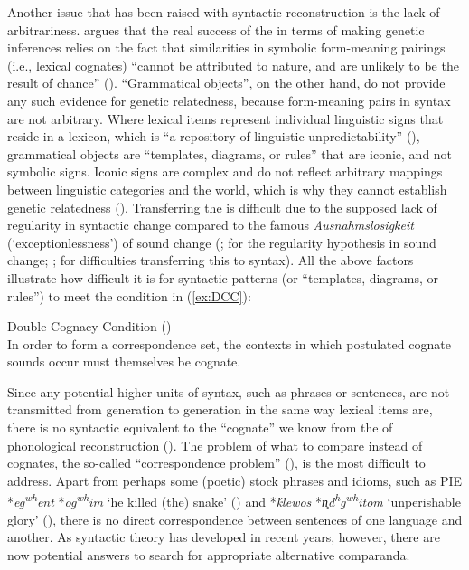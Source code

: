 \documentclass[output=paper,colorlinks,citecolor=brown]{langscibook}
\begin{document}
Another issue that has been raised with syntactic reconstruction is the lack of arbitrariness. \citet{mm:harrison_limits_2003} argues that the real success of the  in terms of making genetic inferences relies on the fact that similarities in symbolic form-meaning pairings (i.e., lexical cognates) ``cannot be attributed to nature, and are unlikely to be the result of chance'' (\cite[223]{mm:harrison_limits_2003}). “Grammatical objects”, on the other hand, do not provide any such evidence for genetic relatedness, because form-meaning pairs in syntax are not arbitrary. Where lexical items represent individual linguistic signs that reside in a lexicon, which is “a repository of linguistic unpredictability” (\cite[223]{mm:harrison_limits_2003}), grammatical objects are “templates, diagrams, or rules” that are iconic, and not symbolic signs. Iconic signs are complex and do not reflect arbitrary mappings between linguistic categories and the world, which is why they cannot establish genetic relatedness (\cite[225]{mm:harrison_limits_2003}). Transferring the  is difficult due to the supposed lack of regularity in syntactic change compared to the famous \textit{Ausnahmslosigkeit} (`exceptionlessness') of sound change (\citealt{mm:osthoff_morphologische_1878}; \citealt{mm:labov_resolving_1981} for the regularity hypothesis in sound change; \citealt{mm:lightfoot_myths_2002}; \citealt{mm:pires_how_2008} for difficulties transferring this to syntax). All the above factors illustrate how difficult it is for syntactic patterns (or “templates, diagrams, or rules”) to meet the condition in (\ref{ex:DCC}): 

\ea Double Cognacy Condition (\cite[50]{mm:Walkden2014})\smallskip\\
In order to form a correspondence set, the contexts in which postulated cognate sounds occur must themselves be cognate.
\label{ex:DCC}
\z 

\noindent Since any potential higher units of syntax, such as phrases or sentences, are not transmitted from generation to generation in the same way lexical items are, there is no syntactic equivalent to the “cognate” we know from the  of phonological reconstruction (\cite[125--126]{mm:lightfoot_myths_2002}). The problem of what to compare instead of cognates, the so-called “correspondence problem” (\cite[312]{mm:watkins_towards_1976}), is the most difficult to address. Apart from perhaps some (poetic) stock phrases and idioms, such as PIE *\textit{eg\textsuperscript{{wh}}ent} *\textit{og\textsuperscript{wh}im} `he killed (the) snake' (\cite[301]{mm:watkins1995kill}) and *\textit{ḱlewos} *\textit{n̥d\textsuperscript{h}g\textsuperscript{{wh}}itom} `unperishable glory' (\cite[467]{mm:kuhn1853alphaἰacuteomeganu}), there is no direct correspondence between sentences of one language and another. As syntactic theory has developed in recent years, however, there are now potential answers to search for appropriate alternative comparanda. 
\end{document}
